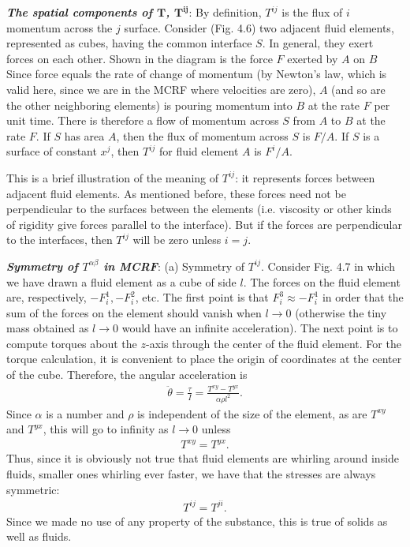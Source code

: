 \documentclass[12pt]{book}
\begin{document}
    \textbf{\textit{The spatial components of \(\mathbf{T}\), \(\mathbf{T^{ij}}\)}}: By definition, \(T^{ij}\) is the flux of \(i\) momentum across the \(j\) surface. Consider (Fig. 4.6) two adjacent fluid elements, represented as cubes, having the common interface \(S\). In general, they exert forces on each other. Shown in the diagram is the force \(F\) exerted by \(A\) on \(B\) Since force equals the rate of change of momentum (by Newton’s law, which is valid here, since we are in the MCRF where velocities are zero), \(A\) (and so are the other neighboring elements) is pouring momentum into \(B\) at the rate \(F\) per unit time.  There is therefore a flow of momentum across \(S\) from \(A\) to \(B\) at the rate \(F\). If \(S\) has area \(A\), then the flux of momentum across \(S\) is \(F/A\). If \(S\) is a surface of constant \(x^j\), then \(T^{ij}\) for fluid element \(A\) is \(F^i / A\).

    This is a brief illustration of the meaning of \(T^{ij}\): it represents forces between adjacent fluid elements. As mentioned before, these forces need not be perpendicular to the surfaces between the elements (i.e. viscosity or other kinds of rigidity give forces parallel to the interface). But if the forces are perpendicular to the interfaces, then \(T^{ij}\) will be zero unless \(i = j\). 

    \textbf{\textit{Symmetry of \(T^{\alpha \beta}\) in MCRF}}:
    (a) Symmetry of \(T^{ij}\). Consider Fig. 4.7 in which we have drawn a fluid element as a cube of side \(l\). The forces on the fluid element are, respectively, \(-F_i^1, -F_i^2\), etc. The first point is that \(F_i^3 \approx -F_i^1\) in order that the sum of the forces on the element should vanish when \(l \to 0\) (otherwise the tiny mass obtained as \(l \to 0\) would have an infinite acceleration). The next point is to compute torques about the \(z\)-axis through the center of the fluid element. For the torque calculation, it is convenient to place the origin of coordinates at the center of the cube. Therefore, the angular acceleration is
    \begin{align}
    \ddot{\theta} = \frac{\tau}{I} = \frac{T^{xy} - T^{yx}}{\alpha \rho l^2}. \tag{4.28}
    \end{align}
    Since \(\alpha\) is a number and \(\rho\) is independent of the size of the element, as are \(T^{xy}\) and \(T^{yx}\), this will go to infinity as \(l \to 0\) unless
    \begin{align}
    T^{xy} = T^{yx}.
    \end{align}
    Thus, since it is obviously not true that fluid elements are whirling around inside fluids, smaller ones whirling ever faster, we have that the stresses are always symmetric:
    \begin{align}
    T^{ij} = T^{ji}. \tag{4.29}
    \end{align}
    Since we made no use of any property of the substance, this is true of solids as well as fluids.
    
\end{document}
